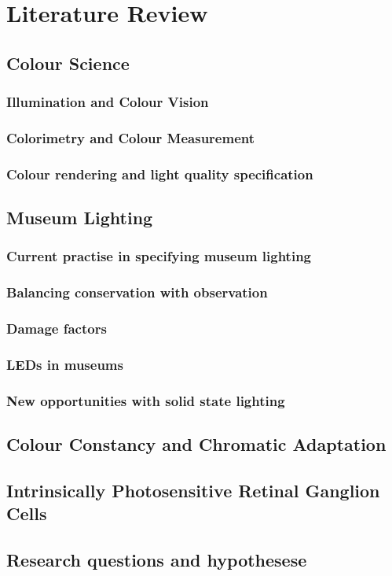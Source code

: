 \chapter{Literature Review}
\label{LitReview}

\section{Colour Science}
\subsection{Illumination and Colour Vision}
\subsection{Colorimetry and Colour Measurement}
\subsection{Colour rendering and light quality specification}

\section{Museum Lighting}
\subsection{Current practise in specifying museum lighting}
\subsection{Balancing conservation with observation}
\subsection{Damage factors}
\subsection{LEDs in museums}
\subsection{New opportunities with solid state lighting}

\section{Colour Constancy and Chromatic Adaptation}
\section{Intrinsically Photosensitive Retinal Ganglion Cells}
\section{Research questions and hypothesese}
